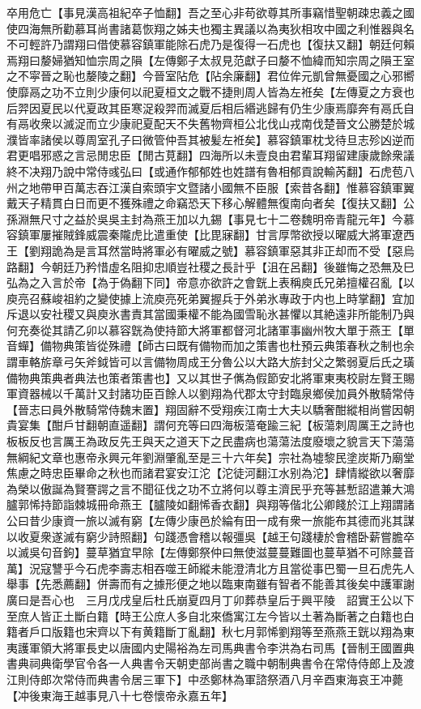 卒用危亡【事見漢高祖紀卒子恤翻】吾之至心非苟欲尊其所事竊惜聖朝疎忠義之國使四海無所勸慕耳尚書諸葛恢翔之姊夫也獨主異議以為夷狄相攻中國之利惟器與名不可輕許乃謂翔曰借使慕容鎮軍能除石虎乃是復得一石虎也【復扶又翻】朝廷何賴焉翔曰嫠婦猶知恤宗周之隕【左傳鄭子太叔見范獻子曰嫠不恤緯而知宗周之隕王室之不寜晉之恥也嫠陵之翻】今晉室阽危【阽余廉翻】君位侔元凱曾無憂國之心邪嚮使靡鬲之功不立則少康何以祀夏桓文之戰不捷則周人皆為左袵矣【左傳夏之方衰也后羿因夏民以代夏政其臣寒浞殺羿而滅夏后相后緡逃歸有仍生少康焉靡奔有鬲氏自有鬲收衆以滅浞而立少康祀夏配天不失舊物齊桓公北伐山戎南伐楚晉文公勝楚於城濮皆率諸侯以尊周室孔子曰微管仲吾其被髪左袵矣】慕容鎮軍枕戈待旦志殄凶逆而君更唱邪惑之言忌閒忠臣【閒古莧翻】四海所以未壹良由君輩耳翔留建康歲餘衆議終不决翔乃說中常侍彧弘曰【或通作郁郁姓也姓譜有魯相郁貢說輸芮翻】石虎苞八州之地帶甲百萬志吞江漢自索頭宇文暨諸小國無不臣服【索昔各翻】惟慕容鎮軍翼戴天子精貫白日而更不獲殊禮之命竊恐天下移心解體無復南向者矣【復扶又翻】公孫淵無尺寸之益於吳吳主封為燕王加以九錫【事見七十二卷魏明帝青龍元年】今慕容鎮軍屢摧賊鋒威震秦隴虎比遣重使【比毘寐翻】甘言厚幣欲授以曜威大將軍遼西王【劉翔詭為是言耳然當時將軍必有曜威之號】慕容鎮軍惡其非正却而不受【惡烏路翻】今朝廷乃矜惜虛名阻抑忠順豈社稷之長計乎【沮在呂翻】後雖悔之恐無及巳弘為之入言於帝【為于偽翻下同】帝意亦欲許之會皝上表稱庾氏兄弟擅權召亂【以庾亮召蘇峻祖約之變使據上流庾亮死弟翼握兵于外弟氷專政于内也上時掌翻】宜加斥退以安社稷又與庾氷書責其當國秉權不能為國雪恥氷甚懼以其絶遠非所能制乃與何充奏從其請乙卯以慕容皝為使持節大將軍都督河北諸軍事幽州牧大單于燕王【單音蟬】備物典策皆從殊禮【師古曰既有備物而加之策書也杜預云典策春秋之制也余謂車輅旂章弓矢斧鉞皆可以言備物周成王分魯公以大路大旂封父之繁弱夏后氏之璜備物典策典者典法也策者策書也】又以其世子㒞為假節安北將軍東夷校尉左賢王賜軍資器械以千萬計又封諸功臣百餘人以劉翔為代郡太守封臨泉鄉侯加員外散騎常侍【晉志曰員外散騎常侍魏末置】翔固辭不受翔疾江南士大夫以驕奢酣縱相尚嘗因朝貴宴集【酣戶甘翻朝直遥翻】謂何充等曰四海板蕩奄踰三紀【板蕩刺周厲王之詩也板板反也言厲王為政反先王與天之道天下之民盡病也蕩蕩法度廢壞之貌言天下蕩蕩無綱紀文章也惠帝永興元年劉淵肇亂至是三十六年矣】宗社為墟黎民塗炭斯乃廟堂焦慮之時忠臣畢命之秋也而諸君宴安江沱【沱徒河翻江水别為沱】肆情縱欲以奢靡為榮以傲誕為賢謇諤之言不聞征伐之功不立將何以尊主濟民乎充等甚慙詔遣兼大鴻臚郭悕持節詣棘城冊命燕王【臚陵如翻悕香衣翻】與翔等偕北公卿餞於江上翔謂諸公曰昔少康資一旅以滅有窮【左傳少康邑於綸有田一成有衆一旅能布其德而兆其謀以收夏衆遂滅有窮少詩照翻】句踐憑會稽以報彊吳【越王句踐棲於會稽卧薪嘗膽卒以滅吳句音鉤】蔓草猶宜早除【左傳鄭祭仲曰無使滋蔓蔓難圖也蔓草猶不可除蔓音萬】況寇讐乎今石虎李壽志相吞噬王師縱未能澄清北方且當從事巴蜀一旦石虎先人舉事【先悉薦翻】併壽而有之據形便之地以臨東南雖有智者不能善其後矣中護軍謝廣曰是吾心也　三月戊戌皇后杜氏崩夏四月丁卯葬恭皇后于興平陵　詔實王公以下至庶人皆正土斷白籍【時王公庶人多自北來僑寓江左今皆以土著為斷著之白籍也白籍者戶口版籍也宋齊以下有黄籍斷丁亂翻】秋七月郭悕劉翔等至燕燕王皝以翔為東夷護軍領大將軍長史以唐國内史陽裕為左司馬典書令李洪為右司馬【晉制王國置典書典祠典衛學官令各一人典書令天朝吏部尚書之職中朝制典書令在常侍侍郎上及渡江則侍郎次常侍而典書令居三軍下】中丞鄭林為軍諮祭酒八月辛酉東海哀王冲薨【冲後東海王越事見八十七卷懷帝永嘉五年】

